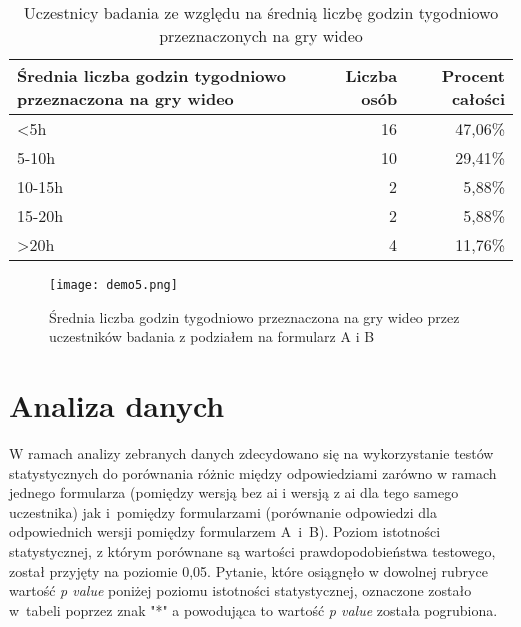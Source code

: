 \begin{table}[h!]
    \begin{center}
        \begin{tabular}{|m{15em}|r|r|}
            \hline
            Średnia liczba godzin tygodniowo \newline przeznaczona na gry wideo & Liczba osób & Procent całości \\
            \hline
            <5h                                                                 & 16          & 47,06\%         \\
            5-10h                                                               & 10          & 29,41\%         \\
            10-15h                                                              & 2           & 5,88\%          \\
            15-20h                                                              & 2           & 5,88\%          \\
            >20h                                                                & 4           & 11,76\%         \\
            \hline
        \end{tabular}
    \end{center}
    \caption{Uczestnicy badania ze względu na średnią liczbę godzin tygodniowo przeznaczonych na gry wideo}\label{tab1:ch7_5}
\end{table}

\begin{figure}[h!]
    \centering
    \texttt{[image: demo5.png]}
    \caption{Średnia liczba godzin tygodniowo przeznaczona na gry wideo przez uczestników badania z podziałem na formularz A i B}
    \label{fig:ch7_demo5}
\end{figure}

\newpage

\section{Analiza danych}\label{section:ch7_2}

W ramach analizy zebranych danych zdecydowano się na wykorzystanie testów statystycznych do porównania różnic między
odpowiedziami zarówno w ramach jednego formularza (pomiędzy wersją bez \gls{ai} i wersją z \gls{ai} dla tego samego uczestnika)
jak i~pomiędzy formularzami (porównanie odpowiedzi dla odpowiednich wersji pomiędzy formularzem A~i~B). Poziom
istotności statystycznej, z którym porównane są wartości prawdopodobieństwa testowego, został przyjęty na poziomie 0,05.
Pytanie, które osiągnęło w dowolnej rubryce wartość \textit{p value} poniżej poziomu istotności statystycznej,
oznaczone zostało w~tabeli poprzez znak "*" a powodująca to wartość \textit{p value} została pogrubiona.

